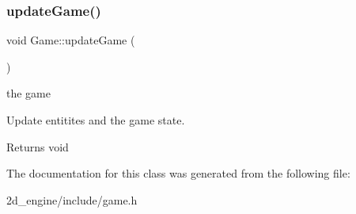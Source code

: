 \subsubsection{\texorpdfstring{update\+Game()}{updateGame()}}
{\footnotesize\ttfamily void Game\+::update\+Game (\begin{DoxyParamCaption}{ }\end{DoxyParamCaption})}

the game

Update entitites and the game state.

\begin{DoxyReturn}{Returns}
void 
\end{DoxyReturn}


The documentation for this class was generated from the following file\+:\begin{DoxyCompactItemize}
\item 
2d\+\_\+engine/include/game.\+h\end{DoxyCompactItemize}
